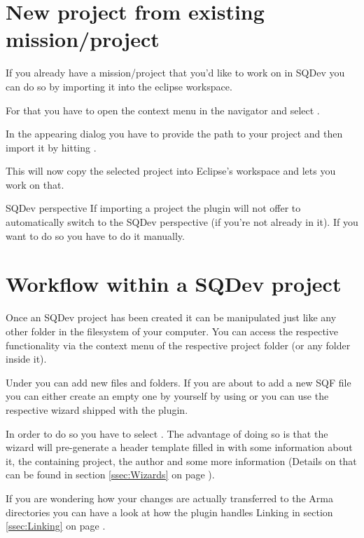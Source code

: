 \documentclass[twoside=false]{scrbook}
\newcommand{\SQDev}{SQDev\xspace}
\newcommand{\eclipse}{Eclipse\xspace}
\newcommand{\arma}{Arma\xspace}
\begin{document}
	
	\section{New project from existing mission/project}
	If you already have a mission/project that you'd like to work on in \SQDev you can do so by importing it into the eclipse workspace.
	
	For that you have to open the context menu in the navigator and select .
	
	In the appearing dialog you have to provide the path to your project and then import it by hitting .
	
	This will now copy the selected project into \eclipse's workspace and lets you work on that.
	
	\begin{info}{\SQDev perspective}
		If importing a project the plugin will not offer to automatically switch to the \SQDev perspective (if you're not already in it). If you want to do so you have to do it manually.
	\end{info}
	
	
	
	\section{Workflow within a \SQDev project}
	Once an \SQDev project has been created it can be manipulated just like any other folder in the filesystem of your computer. You can access the respective functionality via the context menu of the respective project folder (or any folder inside it).
	
	Under  you can add new files and folders. If you are about to add a new SQF file you can either create an empty one by yourself by using  or you can use the respective wizard shipped with the plugin.
	
	In order to do so you have to select . The advantage of doing so is that the wizard will pre-generate a header template filled in with some information about it, the containing project, the author and some more information (Details on that can be found in section \ref{ssec:Wizards} on page \pageref{ssec:Wizards}).
	
	If you are wondering how your changes are actually transferred to the \arma directories you can have a look at how the plugin handles Linking in section \ref{ssec:Linking} on page \pageref{ssec:Linking}.
	
\end{document}
